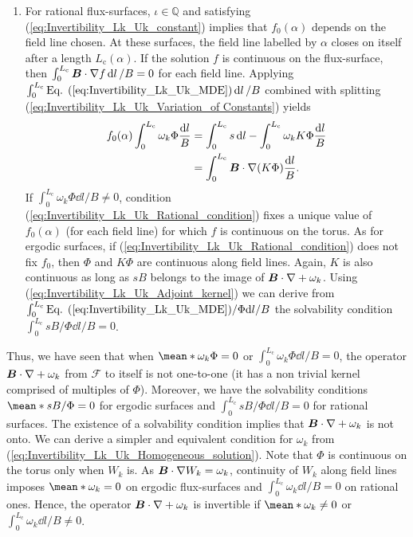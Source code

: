 \documentclass[10pt]{iopart}
\begin{document}
\begin{enumerate}
	\item For rational flux-surfaces, $\iota\in \mathbb{Q}$ and satisfying (\ref{eq:Invertibility_Lk_Uk_constant}) implies that $f_0(\alpha)$ depends on the field line chosen. At these surfaces, the field line labelled by $\alpha$ closes on itself after a length $L_{\text{c}}(\alpha)$. If the solution $f$ is continuous on the flux-surface, then $\int_{0}^{L_{\text{c}}} \vb*{B}\cdot\nabla f \dd{l}/B=0$ for each field line. Applying $\int_{0}^{L_{\text{c}}} \text{Eq. (\ref{eq:Invertibility_Lk_Uk_MDE})}\dd{l}/B$ combined with splitting (\ref{eq:Invertibility_Lk_Uk_Variation_of Constants}) yields
	\begin{align}
		f_0(\alpha)
		\int_{0}^{L_{\text{c}}} \omega_k \Phi \frac{\dd{l}}{B}  
		& =  
		\int_{0}^{L_{\text{c}}} s \dd{l} - \int_{0}^{L_{\text{c}}} \omega_k K \Phi \frac{\dd{l}}{B}
		\nonumber 
		\\
		& =  
		\int_{0}^{L_{\text{c}}} \vb*{B}\cdot\nabla(K \Phi) \frac{\dd{l}}{B}
		. \label{eq:Invertibility_Lk_Uk_Rational_condition}
	\end{align}
	If $\int_{0}^{L_{\text{c}}} \omega_k \Phi {\dd{l}}/{B} \ne 0$, condition (\ref{eq:Invertibility_Lk_Uk_Rational_condition}) fixes a unique value of $f_0(\alpha)$ (for each field line) for which $f$ is continuous on the torus. As for ergodic surfaces, if (\ref{eq:Invertibility_Lk_Uk_Rational_condition}) does not fix $f_0$, then $\Phi$ and $K\Phi$ are continuous along field lines. Again, $K$ is also continuous as long as $sB$ belongs to the image of $\vb*{B}\cdot \nabla + \omega_k$. Using (\ref{eq:Invertibility_Lk_Uk_Adjoint_kernel}) we can derive from $\int_{0}^{L_{\text{c}}}\text{Eq. (\ref{eq:Invertibility_Lk_Uk_MDE})}/\Phi{\dd{l}}/{B}$ the solvability condition $\int_{0}^{L_{\text{c}}}sB/\Phi{\dd{l}}/{B}=0$.
\end{enumerate}

Thus, we have seen that when $\mean*{\omega_k \Phi}=0$ or $\int_{0}^{L_{\text{c}}} \omega_k \Phi {\dd{l}}/{B}=0$, the operator $\vb*{B}\cdot\nabla + \omega_k$ from $\mathcal{F}$ to itself is not one-to-one (it has a non trivial kernel comprised of multiples of $\Phi$).  
Moreover, we have the solvability conditions $\mean*{sB/\Phi}=0$ for ergodic surfaces and $\int_{0}^{L_\text{c}}sB/\Phi\dd{l}/B = 0$ for rational surfaces. The existence of a solvability condition implies that $\vb*{B}\cdot\nabla + \omega_k$ is not onto. We can derive a simpler and equivalent condition for $\omega_k$ from (\ref{eq:Invertibility_Lk_Uk_Homogeneous_solution}). Note that $\Phi$ is continuous on the torus only when $W_k$ is. As $\vb*{B}\cdot\nabla W_k = \omega_k$, continuity of $W_k$ along field lines imposes $\mean*{\omega_k}=0$ on ergodic flux-surfaces and $\int_{0}^{L_{\text{c}}} \omega_k  {\dd{l}}/{B} =0$ on rational ones. Hence, the operator $\vb*{B}\cdot\nabla + \omega_k$ is invertible if $\mean*{\omega_k} \ne 0 $ or $\int_{0}^{L_{\text{c}}} \omega_k {\dd{l}}/{B} \ne 0$. 
\end{document}
